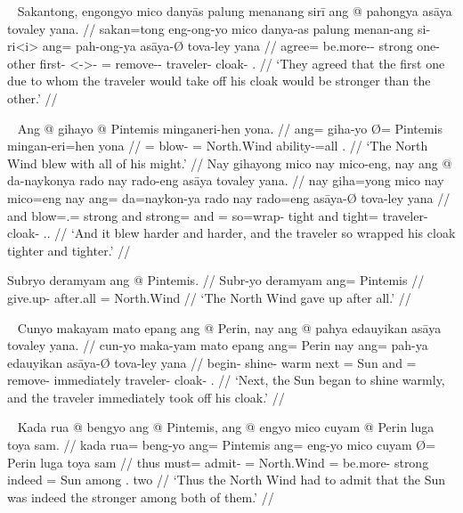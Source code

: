 \ex~ %
\begingl
	\gla Sakantong, engongyo mico danyās palung menanang sirī ang @ pahongya
		asāya tovaley yana. //
	\glb sakan=tong eng-ong-yo mico danya-as palung menan-ang si-ri<i> ang= 
		pah-ong-ya asāya-Ø tova-ley yana //
	\glc agree=\TplN{} be.more-\Irr{}-\TsgN{} strong one-\Parg{} other
		first-\Aarg{} \Rel{}<-\Aarg{}>-\Caus{} \AgtT{}=
		remove-\Irr{}-\TsgM{} traveler-\Top{} cloak-\PargI{}
		\TsgM{}.\Gen{} //
	\glft `They agreed that the first one due to whom the traveler would take
		off his cloak would be stronger than the other.' //
\endgl
\xe

\pex~ %
\a \begingl
	\gla Ang @ gihayo {} @ Pintemis minganeri-hen yona. //
	\glb ang= giha-yo Ø= Pintemis mingan-eri=hen yona //
	\glc \AgtT{}= blow-\TsgN{} \Top{}= North.Wind ability-\Ins{}=all
		\TsgN{}.\Gen{} //
	\glft `The North Wind blew with all of his might.' //
\endgl
\a \begingl
	\gla Nay gihayong mico nay mico-eng, nay ang @ da-naykonya rado nay
		rado-eng asāya tovaley yana. //
	\glb nay giha=yong mico nay mico=eng nay ang= da=naykon-ya rado nay
		rado=eng asāya-Ø tova-ley yana //
	\glc and blow=\TsgN{}.\Aarg{}= strong and strong=\Comp{} and \AgtT{}=
		so=wrap-\TsgM{} tight and tight=\Comp{} traveler-\Top{}
		cloak-\PargI{} \TsgM{}.\Gen{}. //
	\glft `And it blew harder and harder, and the traveler so wrapped his cloak
		tighter and tighter.' //
\endgl

\a \begingl
	\gla Subryo deramyam ang @ Pintemis. //
	\glb Subr-yo deramyam ang= Pintemis //
	\glc give.up-\TsgN{} {after.all} \Aarg{}= North.Wind //
	\glft `The North Wind gave up after all.' //
\endgl
\xe

\ex~ %
\begingl
	\gla Cunyo makayam mato epang ang @ Perin, nay ang @ pahya edauyikan asāya
		tovaley yana. //
	\glb cun-yo maka-yam mato epang ang= Perin nay ang= pah-ya edauyikan
		asāya-Ø tova-ley yana //
	\glc begin-\TsgN{} shine-\Ptcp{} warm next \Aarg{}= Sun and \AgtT{}=
		remove-\TsgM{} immediately traveler-\Top{} cloak-\PargI{} 
		\TsgM{}.\Gen{} //
	\glft `Next, the Sun began to shine warmly, and the traveler immediately
		took off his cloak.' //
\endgl
\xe

\ex~ %
\begingl
	\gla Kada rua @ bengyo ang @ Pintemis, ang @ engyo mico cuyam {} @ Perin
		luga toya sam. //
	\glb kada rua= beng-yo ang= Pintemis ang= eng-yo mico cuyam Ø= Perin luga
		toya sam //
	\glc thus must= admit-\Tsg{} \Aarg{}= North.Wind \AgtT{}= be.more-\TsgN{}
		strong indeed \Top{}= Sun among \TplN{}.\Loc{} two //
	\glft `Thus the North Wind had to admit that the Sun was indeed the
		stronger among both of them.' //
\endgl
\xe

